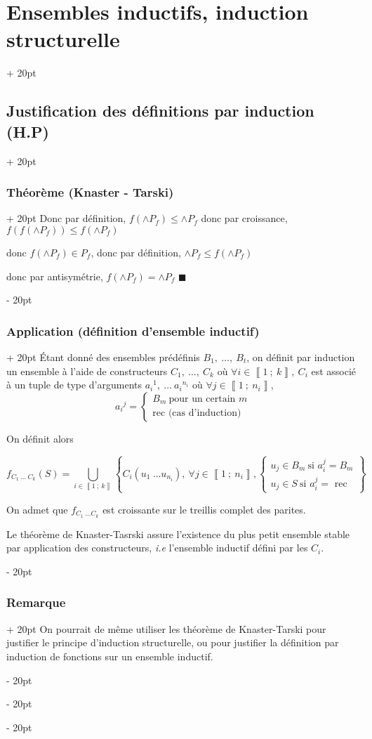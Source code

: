 \documentclass[a4paper, 12pt, twoside]{article}
\newcommand{\nset}[2]{\left\llbracket #1\ ;\ #2 \right\rrbracket}
\newcommand{\eqsys}[2]{\begin{cases} #1 \\ #2 \end{cases}}
\newcommand{\set}[1]{\left\{ #1 \right\}}
\renewcommand{\le}{\leqslant}
\newcommand{\ind}[1][20pt]{\advance\leftskip + #1}
\newcommand{\deind}[1][20pt]{\advance\leftskip - #1}
\newenvironment{indt}[2][20pt]{#2 \par \ind[#1]}{\par \deind} %
\begin{document}
\begin{indt}{\section{Ensembles inductifs, induction structurelle}}
\begin{indt}{\subsection{Justification des définitions par induction (H.P)}}
\begin{indt}{\subsubsection{Théorème (Knaster - Tarski)}}
                Donc par définition, $f(\wedge P_f) \le \wedge P_f$ donc par croissance, $f(f(\wedge P_f)) \le f(\wedge P_f)$
                
                donc $f(\wedge P_f) \in P_f$, donc par définition, $\wedge P_f \le f(\wedge P_f)$
                
                donc par antisymétrie, $\boxed{f(\wedge P_f) = \wedge P_f}$
                $\blacksquare$
            \end{indt}
            
            \vspace{12pt}
            
            \begin{indt}{\subsubsection{Application (définition d'ensemble inductif)}}
                \'Etant donné des ensembles prédéfinis $B_1,\ \ldots,\ B_t$, on définit par induction un ensemble à l'aide de constructeurs $C_1,\ \ldots,\ C_k$ où $\forall i \in \nset 1 k,\ C_i$ est associé à un tuple de type d'arguments ${a_i}^1,\ \ldots\ {a_i}^{n_i}$ où $\forall j \in \nset 1 {n_i}$,
                    \[ {a_i}^j = \eqsys{B_m\ \text{pour un certain $m$}}{\text{rec (cas d'induction)}} \]
                
                On définit alors
                
                    \[ \displaystyle f_{C_1\ \ldots\ C_k}(S) = \bigcup_{i \in \nset 1 k} \set{C_i(u_1\ \ldots u_{n_i}),\ \forall j \in \nset 1 {n_i}, \eqsys{u_j \in B_m\ \text{si $a_i^j = B_m$}}{u_j \in S\ \text{si $a_i^j =$ rec}}} \]
                
                On admet que $f_{C_1\ \ldots C_k}$ est croissante sur le treillis complet des parites.
                
                Le théorème de Knaster-Tasrski assure l'existence du plus petit ensemble stable par application des constructeurs, \textit{i.e} l'ensemble inductif défini par les $C_i$.
            \end{indt}
            
            \vspace{12pt}
            
            \begin{indt}{\subsubsection{Remarque}}
                On pourrait de même utiliser les théorème de Knaster-Tarski pour justifier le principe d'induction structurelle, ou pour justifier la définition par induction de fonctions sur un ensemble inductif.
                

\end{indt}
\end{indt}
\end{indt}
\end{document}
